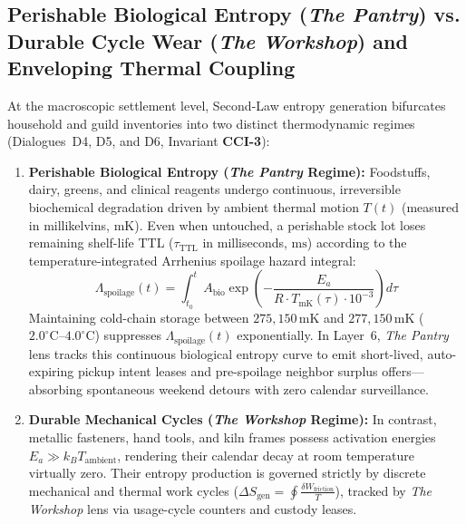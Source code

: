 \subsection{Perishable Biological Entropy (\textit{The Pantry}) vs. Durable Cycle Wear (\textit{The Workshop}) and Enveloping Thermal Coupling}
\label{subsec:th_pantry_vs_workshop_enveloping}
At the macroscopic settlement level, Second-Law entropy generation bifurcates household and guild inventories into two distinct thermodynamic regimes (Dialogues~D4, D5, and D6, Invariant \textbf{CCI-3}):
\begin{enumerate}
    \item \textbf{Perishable Biological Entropy (\textit{The Pantry} Regime):} Foodstuffs, dairy, greens, and clinical reagents undergo continuous, irreversible biochemical degradation driven by ambient thermal motion $T(t)$ (measured in millikelvins, $\mathrm{mK}$). Even when untouched, a perishable stock lot loses remaining shelf-life TTL ($\tau_{\mathrm{TTL}}$ in milliseconds, $\mathrm{ms}$) according to the temperature-integrated Arrhenius spoilage hazard integral:
    \begin{equation}
    \Lambda_{\mathrm{spoilage}}(t) = \int_{t_0}^{t} A_{\mathrm{bio}} \exp\left( -\frac{E_a}{R \cdot T_{\mathrm{mK}}(\tau) \cdot 10^{-3}} \right) d\tau
    \label{eq:pantry_arrhenius_ttl_integral}
    \end{equation}
    Maintaining cold-chain storage between $275{,}150\,\mathrm{mK}$ and $277{,}150\,\mathrm{mK}$ ($2.0^\circ\mathrm{C}\text{--}4.0^\circ\mathrm{C}$) suppresses $\Lambda_{\mathrm{spoilage}}(t)$ exponentially. In Layer~6, \textit{The Pantry} lens tracks this continuous biological entropy curve to emit short-lived, auto-expiring pickup intent leases and pre-spoilage neighbor surplus offers---absorbing spontaneous weekend detours with zero calendar surveillance.
    \item \textbf{Durable Mechanical Cycles (\textit{The Workshop} Regime):} In contrast, metallic fasteners, hand tools, and kiln frames possess activation energies $E_a \gg k_B T_{\mathrm{ambient}}$, rendering their calendar decay at room temperature virtually zero. Their entropy production is governed strictly by discrete mechanical and thermal work cycles ($\Delta S_{\mathrm{gen}} = \oint \frac{\delta W_{\mathrm{friction}}}{T}$), tracked by \textit{The Workshop} lens via usage-cycle counters and custody leases.
\end{enumerate}


